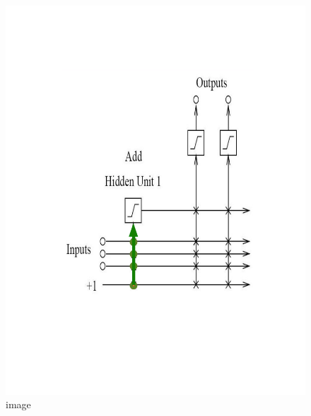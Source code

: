 \documentclass{beamer}
\begin{document}
\begin{frame}
\begin{columns}[t]
\begin{column}{0.5\textwidth}
\begin{figure}
        \includegraphics[scale=0.3]{trainInputunit.png}
        \caption{image}
      \end{figure}			
		\end{column}
	\end{columns}
\end{frame}
\end{document}
